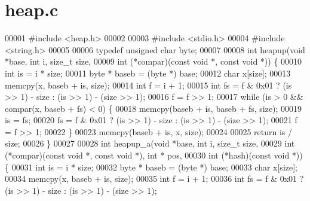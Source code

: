\section{heap.\+c}
\label{heap_8c_source}

\begin{DoxyCode}
00001 \textcolor{preprocessor}{#include <heap.h>}
00002 
00003 \textcolor{preprocessor}{#include <stdio.h>}
00004 \textcolor{preprocessor}{#include <string.h>}
00005 
00006 \textcolor{keyword}{typedef} \textcolor{keywordtype}{unsigned} \textcolor{keywordtype}{char} byte;
00007 
00008 \textcolor{keywordtype}{int} heapup(\textcolor{keywordtype}{void} *base, \textcolor{keywordtype}{int} i, \textcolor{keywordtype}{size\_t} size,
00009                 \textcolor{keywordtype}{int} (*compar)(\textcolor{keyword}{const} \textcolor{keywordtype}{void} *, \textcolor{keyword}{const} \textcolor{keywordtype}{void} *)) \{
00010         \textcolor{keywordtype}{int} is = i * size;
00011         byte * baseb = (byte *) base;
00012         \textcolor{keywordtype}{char} x[size];
00013         memcpy(x, baseb + is, size);
00014         \textcolor{keywordtype}{int} f = i + 1;
00015         \textcolor{keywordtype}{int} fs = f & 0x01 ? (is >> 1) - size : (is >> 1) - (size >> 1);
00016         f = f >> 1;
00017         \textcolor{keywordflow}{while} (is > 0 && compar(x, baseb + fs) < 0) \{
00018                 memcpy(baseb + is, baseb + fs, size);
00019                 is = fs;
00020                 fs = f & 0x01 ? (is >> 1) - size : (is >> 1) - (size >> 1);
00021                 f = f >> 1;
00022         \}
00023         memcpy(baseb + is, x, size);
00024 
00025         \textcolor{keywordflow}{return} is / size;
00026 \}
00027 
00028 \textcolor{keywordtype}{int} heapup_a(\textcolor{keywordtype}{void} *base, \textcolor{keywordtype}{int} i, \textcolor{keywordtype}{size\_t} size,
00029                 \textcolor{keywordtype}{int} (*compar)(\textcolor{keyword}{const} \textcolor{keywordtype}{void} *, \textcolor{keyword}{const} \textcolor{keywordtype}{void} *), \textcolor{keywordtype}{int} * pos,
00030                 \textcolor{keywordtype}{int} (*hash)(\textcolor{keyword}{const} \textcolor{keywordtype}{void} *)) \{
00031         \textcolor{keywordtype}{int} is = i * size;
00032         byte * baseb = (byte *) base;
00033         \textcolor{keywordtype}{char} x[size];
00034         memcpy(x, baseb + is, size);
00035         \textcolor{keywordtype}{int} f = i + 1;
00036         \textcolor{keywordtype}{int} fs = f & 0x01 ? (is >> 1) - size : (is >> 1) - (size >> 1);

\end{DoxyCode}
